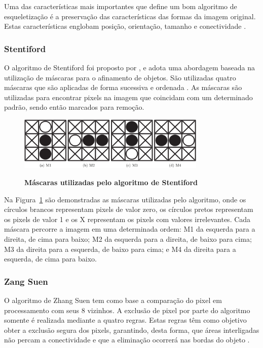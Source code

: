 \documentclass[12pt,oneside,a4paper,english,french,spanish,brazil,]{abntex2}
\begin{document}
Uma das características mais importantes que define um bom algoritmo de esqueletização é a preservação das características das formas da imagem original. Estas características englobam posição, orientação, tamanho e conectividade \cite{guilherme:2007}.

\subsubsection{Stentiford}

O algoritmo de Stentiford foi proposto por \citet{stentiford:1983}, e adota uma abordagem baseada na utilização de máscaras para o afinamento de objetos. São utilizadas quatro máscaras que são aplicadas de forma sucessiva e ordenada \cite{guilherme:2007}. As máscaras são utilizadas para encontrar pixels na imagem que coincidam com um determinado padrão, sendo então marcados para remoção.

\begin{figure}[ht]
\centering
\caption{\textbf{Máscaras utilizadas pelo algoritmo de Stentiford}}
\includegraphics[width=0.8\textwidth]{imagens/PDI_Stentiford_1.PNG}
\label{fig:PDI_Stentiford_1}
\end{figure}

Na Figura~\ref{fig:PDI_Stentiford_1} são demonstradas as máscaras utilizadas pelo algoritmo, onde os círculos brancos representam pixels de valor zero, os círculos pretos representam os pixels de valor 1 e os X representam os pixels com valores irrelevantes. Cada máscara percorre a imagem em uma determinada ordem: M1 da esquerda para a direita, de cima para baixo; M2 da esquerda para a direita, de baixo para cima; M3 da direita para a esquerda, de baixo para cima; e M4 da direita para a esquerda, de cima para baixo.

\subsubsection{Zang Suen}

O algoritmo de Zhang Suen \cite{zhang:1984} tem como base a comparação do pixel em processamento com seus 8 vizinhos. A exclusão de pixel por parte do algoritmo somente é realizada mediante a quatro regras. Estas regras têm como objetivo obter a exclusão segura dos pixels, garantindo, desta forma, que áreas interligadas não percam a conectividade e que a eliminação ocorrerá nas bordas do objeto \cite{guilherme:2007}.
\end{document}
